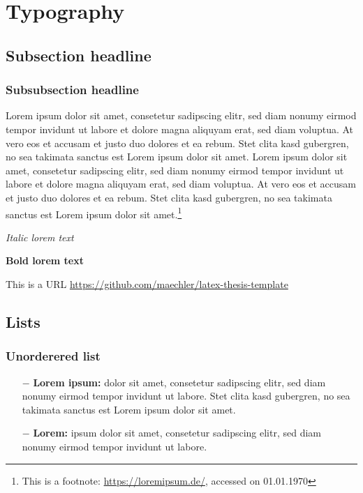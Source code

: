 \section{Typography}
\label{sec:typography}

\subsection{Subsection headline}
\label{sec:typography:subsection}

\subsubsection{Subsubsection headline}
\label{sec:typography:subsection:subsubsection}

\gls{Lorem ipsum} dolor sit amet, consetetur sadipscing elitr, sed diam nonumy eirmod tempor invidunt ut labore et dolore magna aliquyam erat, sed diam voluptua. At vero eos et accusam et justo duo dolores et ea rebum. Stet clita kasd gubergren, no sea takimata sanctus est Lorem ipsum dolor sit amet. Lorem ipsum dolor sit amet, consetetur sadipscing elitr, sed diam nonumy eirmod tempor invidunt ut labore et dolore magna aliquyam erat, sed diam voluptua. At vero eos et accusam et justo duo dolores et ea rebum. Stet clita kasd gubergren, no sea takimata sanctus est Lorem ipsum dolor sit amet.\footnote{This is a footnote: \url{https://loremipsum.de/}, accessed on 01.01.1970}

\textit{Italic lorem text}

\textbf{Bold lorem text}

This is a URL \url{https://github.com/maechler/latex-thesis-template}


\subsection{Lists}
\label{sec:typography:lists}

\subsubsection{Unorderered list}
\label{sec:typography:lists:unordered}

\begin{itemize}
	\item[$-$] \textbf{Lorem ipsum:} dolor sit amet, consetetur sadipscing elitr, sed diam nonumy eirmod tempor invidunt ut labore. Stet clita kasd gubergren, no sea takimata sanctus est Lorem ipsum dolor sit amet.
	
	\item[$-$] \textbf{Lorem:} ipsum dolor sit amet, consetetur sadipscing elitr, sed diam nonumy eirmod tempor invidunt ut labore.
\end{itemize}

